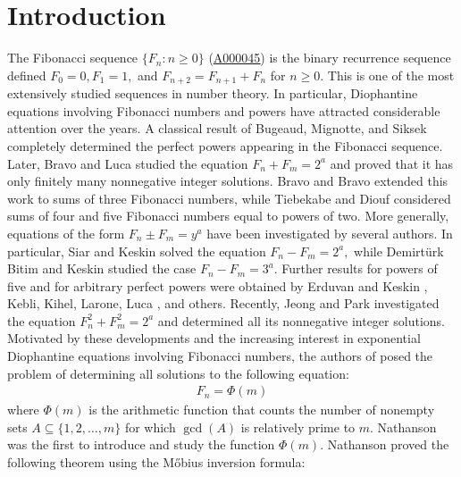 \documentclass[12pt,reqno]{amsart}
\begin{document}
\section{\protect\bigskip Introduction}
The Fibonacci sequence $\{F_n:n\geq0\}$ (\href{https://oeis.org/A000045}{\underline{A000045}}) is the binary recurrence sequence defined $F_0=0,F_1=1,$ and $ F_{n+2}=F_{n+1}+F_n$ for $n\geq0$. This is one of the most extensively studied sequences in number theory. In particular, Diophantine equations involving Fibonacci numbers and powers have attracted considerable attention over the years. A classical result of Bugeaud, Mignotte, and Siksek \cite{r4} completely determined the perfect powers appearing in the Fibonacci sequence. Later, Bravo and Luca \cite{r3} studied the equation $F_n+F_m=2^a$
and proved that it has only finitely many nonnegative integer solutions. Bravo and Bravo \cite{r1} extended this work to sums of three Fibonacci numbers, while Tiebekabe and Diouf \cite{r15,r16} considered sums of four and five Fibonacci numbers equal to powers of two. More generally, equations of the form $F_n\pm F_m=y^a$ have been investigated by several authors. In particular, Siar and Keskin \cite{r14} solved the equation $F_n-F_m=2^a,$
while Demirtürk Bitim and Keskin \cite{r6} studied the case $F_n-F_m=3^a.$
Further results for powers of five and for arbitrary perfect powers were obtained by Erduvan and Keskin \cite{r8}, Kebli, Kihel, Larone, Luca \cite{r10,r11}, and others. Recently, Jeong and Park \cite{r9} investigated the equation
$F_n^2+F_m^2=2^a$ and determined all its nonnegative integer solutions. Motivated by these developments and the increasing interest in exponential Diophantine equations involving Fibonacci numbers, the authors of \cite{Tmm} posed the problem of determining all solutions to the following equation:
\begin{align*}\label{eq1}
 F_n=\Phi(m)\tag{1}   
\end{align*}
where $\Phi(m)$ is the arithmetic function that counts the number of nonempty sets $A \subseteq \{1, 2, \dots, m\}$ for which $\gcd(A)$ is relatively prime to $m$.
Nathanson \cite{Nath} was the first to introduce and study the function $\Phi(m)$. Nathanson \cite{Nath} proved the following theorem using the M\H{o}bius inversion formula:
\end{document}
